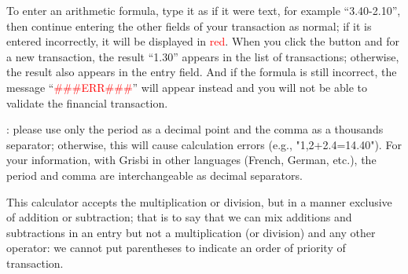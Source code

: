 To enter an arithmetic formula, type it as if it were text, for example \enquote{3.40-2.10}, then continue entering the other fields of your transaction as normal; if it is entered incorrectly, it will be displayed in \textcolor{red}{red}. When you click the  button and for a new transaction, the result \enquote{1.30} appears in the list of transactions; otherwise, the result also appears in the entry field. And if the formula is still incorrect, the message \enquote{\textcolor{red}{\#\#\#\textsf{ERR}\#\#\#}}  will appear instead and you will not be able to validate the financial transaction.

\Attention{}: please use only the period as a decimal point and the comma as a thousands separator; otherwise, this will cause calculation errors (e.g., "1,2+2.4=14.40"). For your information, with Grisbi in other languages (French, German, etc.), the period and comma are interchangeable as decimal separators.

This calculator accepts the multiplication or division, but in a manner exclusive of addition or subtraction; that is to say that we can mix additions and subtractions in an entry but not a multiplication (or division) and any other operator: we cannot put parentheses to indicate an order of priority of transaction.

